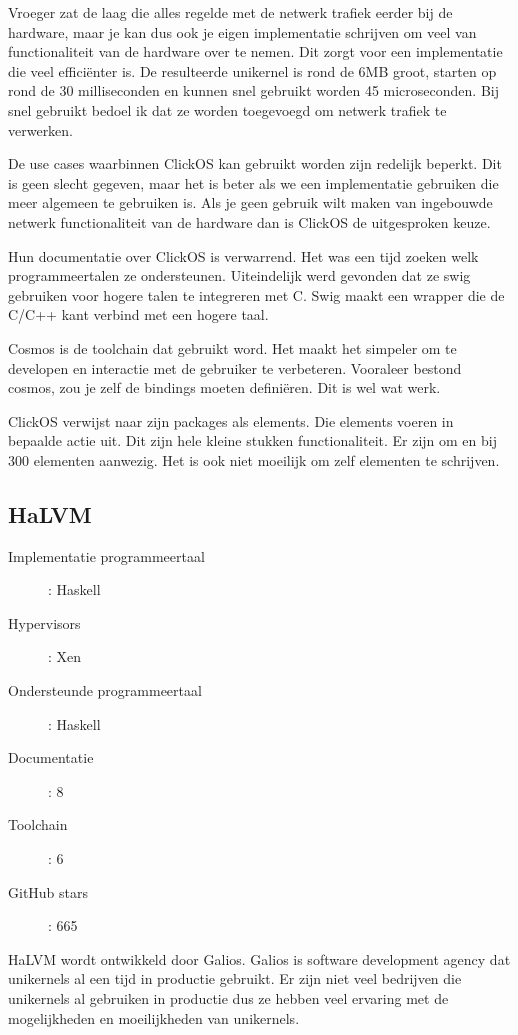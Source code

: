\documentclass[pdftex,a4paper,12pt,twoside]{report}
\begin{document}
Vroeger zat de laag die alles regelde met de netwerk trafiek eerder bij de hardware, maar je kan dus ook je eigen implementatie schrijven om veel van functionaliteit van de hardware over te nemen. Dit zorgt voor een implementatie die veel efficiënter is. De resulteerde unikernel is rond de 6MB groot, starten op rond de 30 milliseconden en kunnen snel gebruikt worden 45 microseconden. Bij snel gebruikt bedoel ik dat ze worden toegevoegd om netwerk trafiek te verwerken.

De use cases waarbinnen ClickOS kan gebruikt worden zijn redelijk beperkt. Dit is geen slecht gegeven, maar het is beter als we een implementatie gebruiken die meer algemeen te gebruiken is.
Als je geen gebruik wilt maken van ingebouwde netwerk functionaliteit van de hardware dan is ClickOS de uitgesproken keuze.

Hun documentatie over ClickOS is verwarrend. Het was een tijd zoeken welk programmeertalen ze ondersteunen.
Uiteindelijk werd gevonden dat ze swig gebruiken voor hogere talen te integreren met C. Swig maakt een wrapper die de C/C++ kant verbind met een hogere taal.

Cosmos is de toolchain dat gebruikt word. Het maakt het simpeler om te developen en interactie met de gebruiker te verbeteren. Vooraleer bestond cosmos, zou je zelf de bindings moeten definiëren. Dit is wel wat werk.

ClickOS verwijst naar zijn packages als elements. Die elements voeren in bepaalde actie uit. Dit zijn hele kleine stukken functionaliteit. Er zijn om en bij 300 elementen aanwezig. 
Het is ook niet moeilijk om zelf elementen te schrijven.

\subsection{HaLVM}

\begin{description}
  \item [Implementatie programmeertaal]: Haskell
  \item [Hypervisors]: Xen
  \item [Ondersteunde programmeertaal]: Haskell
  \item [Documentatie]: 8
  \item [Toolchain]: 6
  \item [GitHub stars]: 665
\end{description}

HaLVM wordt ontwikkeld door Galios. Galios is software development agency dat unikernels al een tijd in productie gebruikt.
Er zijn niet veel bedrijven die unikernels al gebruiken in productie dus ze hebben veel ervaring met de mogelijkheden en moeilijkheden van unikernels.
\end{document}

